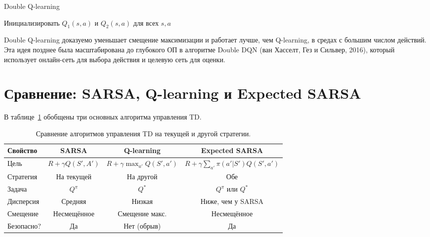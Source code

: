 \begin{algorithm}[ht]
\caption{Double Q-learning}
\label{alg:double-q}
Инициализировать $Q_1(s,a)$ и $Q_2(s,a)$ для всех $s,a$\;
\end{algorithm}

Double Q-learning доказуемо уменьшает смещение максимизации и работает лучше, чем Q-learning, в средах с большим числом действий.  Эта идея позднее была масштабирована до глубокого ОП в алгоритме Double DQN (ван Хасселт, Гез и Сильвер, 2016), который использует онлайн-сеть для выбора действия и целевую сеть для оценки.

\section{Сравнение: SARSA, Q-learning и Expected SARSA}
\label{sec:td-control-comparison}

В таблице~\ref{tab:td-control-comparison} обобщены три основных алгоритма управления TD.

\begin{table}[ht]
\centering
\caption{Сравнение алгоритмов управления TD на текущей и другой стратегии.}
\label{tab:td-control-comparison}
\small
\begin{tabular}{@{}lccc@{}}
\toprule
\textbf{Свойство} & \textbf{SARSA} & \textbf{Q-learning} & \textbf{Expected SARSA}\\
\midrule
Цель & $R\!+\!\gamma Q(S',A')$ & $R\!+\!\gamma\max_{a'}Q(S',a')$ & $R\!+\!\gamma\!\sum_{a'}\pi(a'|S')Q(S',a')$\\
Стратегия & На текущей & На другой & Обе\\
Задача & $Q^\pi$ & $Q^*$ & $Q^\pi$ или $Q^*$\\
Дисперсия & Средняя & Низкая & Ниже, чем у SARSA\\
Смещение & Несмещённое & Смещение макс. & Несмещённое\\
Безопасно? & Да & Нет (обрыв) & Да\\
\bottomrule
\end{tabular}
\end{table}

